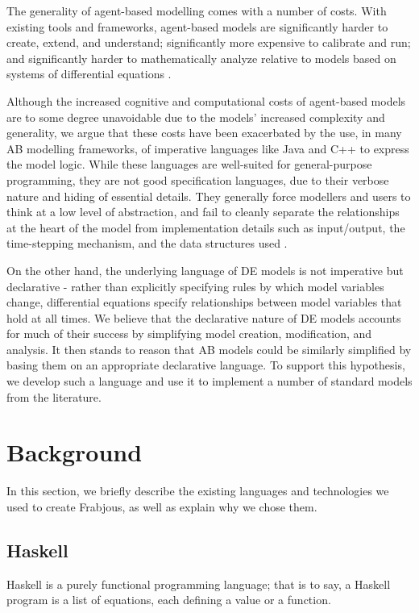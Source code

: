 \documentclass{llncs}
\begin{document}
  The generality of agent-based modelling comes with a number of costs. With existing tools and frameworks, agent-based models are significantly harder to create, extend, and understand; significantly more expensive to calibrate and run; and significantly harder to mathematically analyze relative to models based on systems of differential equations \cite{ab_vs_de}. 
  
  Although the increased cognitive and computational costs of agent-based models are to some degree unavoidable due to the models' increased complexity and generality, we argue that these costs have been exacerbated by the use, in many AB modelling frameworks, of imperative languages like Java and C++ to express the model logic. While these languages are well-suited for general-purpose programming, they are not good specification languages, due to their verbose nature and hiding of essential details. They generally force modellers and users to think at a low level of abstraction, and fail to cleanly separate the relationships at the heart of the model from implementation details such as input/output, the time-stepping mechanism, and the data structures used \cite{system_dyn_tradeoffs}. 
  
  On the other hand, the underlying language of DE models is not imperative but declarative - rather than explicitly specifying rules by which model variables change, differential equations specify relationships between model variables that hold at all times. We believe that the declarative nature of DE models accounts for much of their success by simplifying model creation, modification, and analysis. It then stands to reason that AB models could be similarly simplified by basing them on an appropriate declarative language. To support this hypothesis, we develop such a language and use it to implement a number of standard models from the literature. 
  
\section{Background}

In this section, we briefly describe the existing languages and technologies we used to create Frabjous, as well as explain why we chose them.

\subsection{Haskell}

  Haskell is a purely functional programming language; that is to say, a Haskell program is a list of equations, each defining a value or a function.
\end{document}
